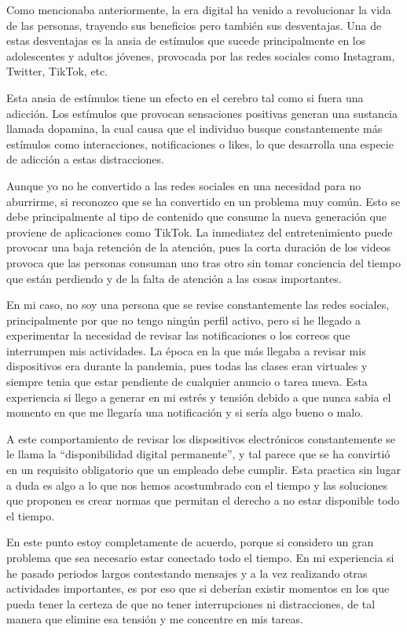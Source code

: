 \documentclass[12pt, titlepage]{article}
\begin{document}
    Como mencionaba anteriormente, la era digital ha venido a revolucionar la vida de las personas, trayendo sus beneficios pero también sus desventajas. Una de estas desventajas es la ansia de estímulos que sucede principalmente en los adolescentes y adultos jóvenes, provocada por las redes sociales como Instagram, Twitter, TikTok, etc. 

    Esta ansia de estímulos tiene un efecto en el cerebro tal como si fuera una adicción. Los estímulos que provocan sensaciones positivas generan una sustancia llamada dopamina, la cual causa que el individuo busque constantemente más estímulos como interacciones, notificaciones o likes, lo que desarrolla una especie de adicción a estas distracciones.

    Aunque yo no he convertido a las redes sociales en una necesidad para no aburrirme, si reconozco que se ha convertido en un problema muy común. Esto se debe principalmente al tipo de contenido que consume la nueva generación que proviene de aplicaciones como TikTok. La inmediatez del entretenimiento puede provocar una baja retención de la atención, pues la corta duración de los videos provoca que las personas consuman uno tras otro sin tomar conciencia del tiempo que están perdiendo y de la falta de atención a las cosas importantes.  

    En mi caso, no soy una persona que se revise constantemente las redes sociales, principalmente por que no tengo ningún perfil activo, pero si he llegado a experimentar la necesidad de revisar las notificaciones o los correos que interrumpen mis actividades. La época en la que más llegaba a revisar mis dispositivos era durante la pandemia, pues todas las clases eran virtuales y siempre tenia que estar pendiente de cualquier anuncio o tarea nueva. Esta experiencia si llego a generar en mi estrés y tensión debido a que nunca sabia el momento en que me llegaría una notificación y si sería algo bueno o malo.

    A este comportamiento de revisar los dispositivos electrónicos constantemente se le llama la ``disponibilidad digital permanente'', y tal parece que se ha convirtió en un requisito obligatorio que un empleado debe cumplir. Esta practica sin lugar a duda es algo a lo que nos hemos acostumbrado con el tiempo y las soluciones que proponen es crear normas que permitan el derecho a no estar disponible todo el tiempo.

    En este punto estoy completamente de acuerdo, porque si considero un gran problema que sea necesario estar conectado todo el tiempo. En mi experiencia si he pasado periodos largos contestando mensajes y a la vez realizando otras actividades importantes, es por eso que si deberían existir momentos en los que pueda tener la certeza de que no tener interrupciones ni distracciones, de tal manera que elimine esa tensión y me concentre en mis tareas.
\end{document}

